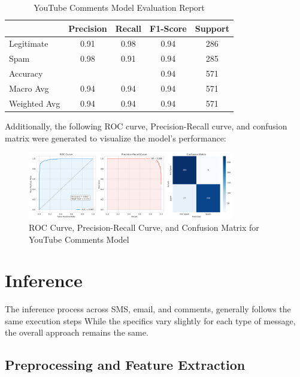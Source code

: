 \documentclass{article}
\begin{document}
\begin{table}[htbp]
    \centering
    \caption{YouTube Comments Model Evaluation Report}
    \begin{tabular}{l c c c c}
    \toprule
     & Precision & Recall & F1-Score & Support \\
    \midrule
    Legitimate & 0.91 & 0.98 & 0.94 & 286 \\
    Spam & 0.98 & 0.91 & 0.94 & 285 \\
    \midrule
    Accuracy  & & & 0.94 & 571 \\
    Macro Avg & 0.94 & 0.94 & 0.94 & 571 \\
    Weighted Avg & 0.94 & 0.94 & 0.94 & 571 \\
    \bottomrule
    \end{tabular}
    \label{tab:gbm_evaluation}
\end{table}

\noindent
Additionally, the following ROC curve, Precision-Recall curve, and confusion matrix were generated to visualize the model's performance:
\begin{figure}[htbp]
    \centering
    \includegraphics[width=0.8\textwidth]{../analysis/comment/comment_model_performance.png}
    \caption{ROC Curve, Precision-Recall Curve, and Confusion Matrix for YouTube Comments Model}
    \label{fig:roc_curve_5}
\end{figure}

\newpage

\section{Inference}

The inference process across SMS, email, and comments, generally follows the same execution steps While the specifics vary slightly for each type of message, the overall approach remains the same.


\subsection{Preprocessing and Feature Extraction}
\end{document}
